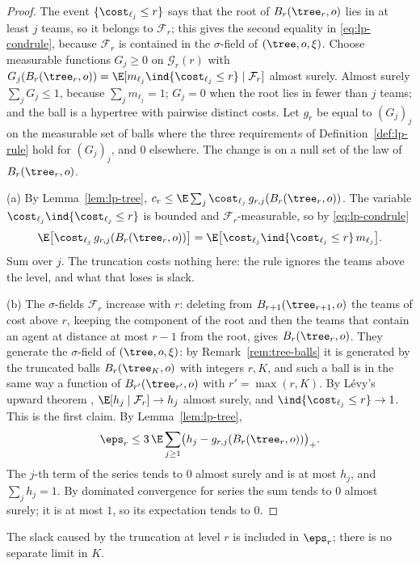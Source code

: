 \begin{proof}
The event $\{\cost_{\ell_j}\le r\}$ says that the root of $B_r(\tree_r,o)$ lies in at least
$j$ teams, so it belongs to $\mathcal F_r$; this gives the second equality in
\eqref{eq:lp-condrule}, because $\mathcal F_r$ is contained in the $\sigma$-field of
$(\tree,o,\xi)$. Choose measurable functions $G_j\ge0$ on $\mathcal G_r(r)$ with
$G_j(B_r(\tree_r,o))=\E[m_{\ell_j}\ind\{\cost_{\ell_j}\le r\}\mid\mathcal F_r]$ almost surely.
Almost surely $\sum_jG_j\le1$, because $\sum_jm_{\ell_j}=1$; $G_j=0$ when the root lies in
fewer than $j$ teams; and the ball is a hypertree with pairwise distinct costs. Let $g_r$ be
equal to $(G_j)_j$ on the measurable set of balls where the three requirements of
Definition~\ref{def:lp-rule} hold for $(G_j)_j$, and $0$ elsewhere. The change is on a null
set of the law of $B_r(\tree_r,o)$.

(a) By Lemma~\ref{lem:lp-tree}, $c_r\le\E\sum_j\cost_{\ell_j}\,g_{r,j}(B_r(\tree_r,o))$.
The variable $\cost_{\ell_j}\ind\{\cost_{\ell_j}\le r\}$ is bounded and
$\mathcal F_r$-measurable, so by \eqref{eq:lp-condrule}
\[
\E\bigl[\cost_{\ell_j}\,g_{r,j}(B_r(\tree_r,o))\bigr]
=\E\bigl[\cost_{\ell_j}\ind\{\cost_{\ell_j}\le r\}\,m_{\ell_j}\bigr].
\]
Sum over $j$. The truncation costs nothing here: the rule ignores the teams above the level,
and what that loses is slack.

(b) The $\sigma$-fields $\mathcal F_r$ increase with $r$: deleting from
$B_{r+1}(\tree_{r+1},o)$ the teams of cost above $r$, keeping the component of the root and
then the teams that contain an agent at distance at most $r-1$ from the root, gives
$B_r(\tree_r,o)$. They generate the $\sigma$-field of $(\tree,o,\xi)$: by Remark~\ref{rem:tree-balls}
it is generated by the truncated balls $B_r(\tree_K,o)$ with integers $r,K$, and such a
ball is in the same way a function of $B_{r'}(\tree_{r'},o)$ with $r'=\max(r,K)$. By
L\'evy's upward theorem \cite{Kallenberg21},
$\E[h_j\mid\mathcal F_r]\to h_j$ almost surely, and
$\ind\{\cost_{\ell_j}\le r\}\to1$. This is the first claim. By Lemma~\ref{lem:lp-tree},
\[
\eps_r\le3\,\E\sum_{j\ge1}\bigl(h_j-g_{r,j}(B_r(\tree_r,o))\bigr)_+ .
\]
The $j$-th term of the series tends to $0$ almost surely and is at most $h_j$, and
$\sum_jh_j=1$. By dominated convergence for series the sum tends to $0$ almost surely; it is
at most $1$, so its expectation tends to $0$.
\end{proof}

The slack caused by the truncation at level $r$ is included in $\eps_r$; there is no
separate limit in $K$.


